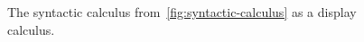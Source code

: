 \begin{figure}
\begin{mdframed}
    \vspace*{\baselineskip}
    \begin{pfbox}
      \doubleLine{}
    \end{pfbox}
    \vspace*{\baselineskip}
    \begin{pfbox}
      \doubleLine{}
    \end{pfbox}
  \end{mdframed}
  \caption{
    The syntactic calculus from~\autoref{fig:syntactic-calculus} as a
    display calculus.}%
  \label{fig:display-calculus}
\end{figure}
%

%
